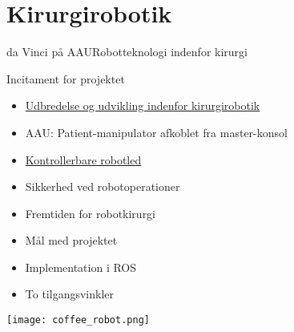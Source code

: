 \section{Kirurgirobotik}
\begin{frame}{da Vinci på AAU}{Robotteknologi indenfor kirurgi}
\vspace{8mm}
\begin{block}{Incitament for projektet}
	\begin{itemize}
		\item \href{file:video/surgery_robotics_history_davinci_chart.mp4}{Udbredelse og udvikling indenfor kirurgirobotik}
		\item AAU: Patient-manipulator afkoblet fra master-konsol 
		\item \href{file:video/davinci_joints.mp4}{Kontrollerbare robotled}
		\item Sikkerhed ved robotoperationer
		\item Fremtiden for robotkirurgi
		\item Mål med projektet
		\item Implementation i ROS
		\item To tilgangsvinkler
	\end{itemize}
\end{block}
\begin{flushright}
	\vspace{-30mm}
\texttt{[image: coffee\_robot.png]}
\end{flushright}
\vspace{1cm}
\end{frame}

